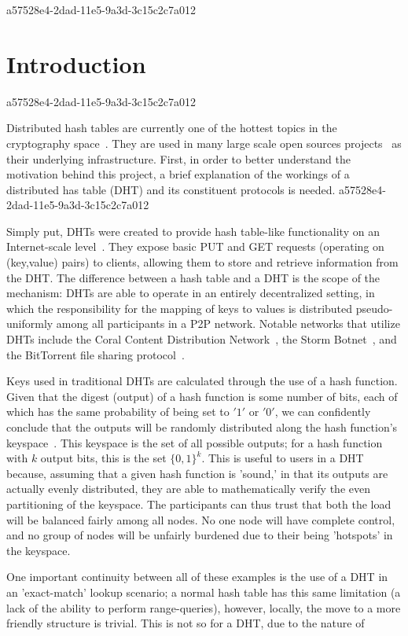 \documentclass[12pt]{article}
\begin{document}
a57528e4-2dad-11e5-9a3d-3c15c2c7a012\section{Introduction}
a57528e4-2dad-11e5-9a3d-3c15c2c7a012\par Distributed hash tables are currently one of the hottest topics in the cryptography space~\cite{Stoica:2001dj,Rowstron:2001ea,Ratnasamy:2001wn}. They are used in many large scale open sources projects~\cite{Freitas:2013tb,Xu:2010vs,Perfitt:2010fh} as their underlying infrastructure. First, in order to better understand the motivation behind this project, a brief explanation of the workings of a distributed has table (DHT) and its constituent protocols is needed.
a57528e4-2dad-11e5-9a3d-3c15c2c7a012
\par Simply put, DHTs were created to provide hash table-like functionality on an Internet-scale level~\cite{Ratnasamy:2001wn}. They expose basic PUT and GET requests (operating on (key,value) pairs) to clients, allowing them to store and retrieve information from the DHT. The difference between a hash table and a DHT is the scope of the mechanism: DHTs are able to operate in an entirely decentralized setting, in which the responsibility for the mapping of keys to values is distributed pseudo-uniformly among all participants in a P2P network. Notable networks that utilize DHTs include the Coral Content Distribution Network~\cite{Freedman:2004vb}, the Storm Botnet~\cite{Holz:2008uk}, and the BitTorrent file sharing protocol~\cite{Cohen:y1_8mBnw}.

\par Keys used in traditional DHTs are calculated through the use of a hash function. Given that the digest (output) of a hash function is some number of bits, each of which has the same probability of being set to $'1'$ or $'0'$, we can confidently conclude that the outputs will be randomly distributed along the hash function's keyspace~. This keyspace is the set of all possible outputs; for a hash function with $k$ output bits, this is the set $\{0,1\}^k$. This is useful to users in a DHT because, assuming that a given hash function is 'sound,' in that its outputs are actually evenly distributed, they are able to mathematically verify the even partitioning of the keyspace. The participants can thus trust that both the load will be balanced fairly among all nodes. No one node will have complete control, and no group of nodes will be unfairly burdened due to their being 'hotspots' in the keyspace.~

\par One important continuity between all of these examples is the use of a DHT in an 'exact-match' lookup scenario; a normal hash table has this same limitation (a lack of the ability to perform range-queries), however, locally, the move to a more friendly structure is trivial. This is not so for a DHT, due to the nature of
\printbibliography
\end{document}
